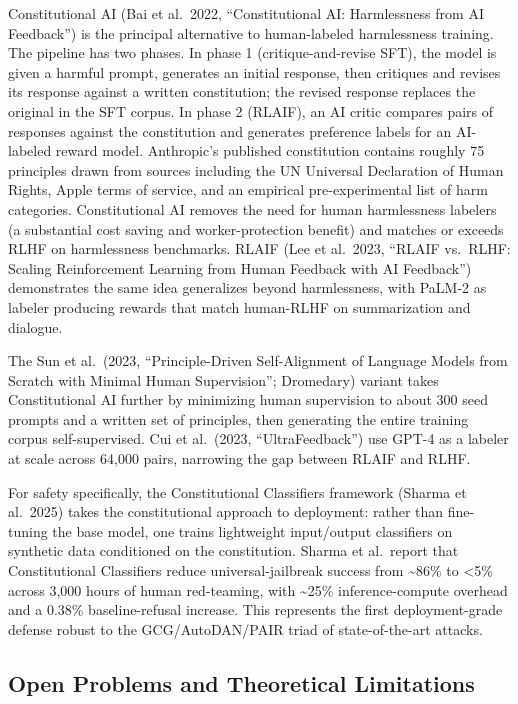 \documentclass{article}
\begin{document}
Constitutional AI (Bai et al.~2022, ``Constitutional AI: Harmlessness from AI Feedback'') is the principal alternative to human-labeled harmlessness training. The pipeline has two phases. In phase 1 (critique-and-revise SFT), the model is given a harmful prompt, generates an initial response, then critiques and revises its response against a written constitution; the revised response replaces the original in the SFT corpus. In phase 2 (RLAIF), an AI critic compares pairs of responses against the constitution and generates preference labels for an AI-labeled reward model. Anthropic's published constitution contains roughly 75 principles drawn from sources including the UN Universal Declaration of Human Rights, Apple terms of service, and an empirical pre-experimental list of harm categories. Constitutional AI removes the need for human harmlessness labelers (a substantial cost saving and worker-protection benefit) and matches or exceeds RLHF on harmlessness benchmarks. RLAIF (Lee et al.~2023, ``RLAIF vs.~RLHF: Scaling Reinforcement Learning from Human Feedback with AI Feedback'') demonstrates the same idea generalizes beyond harmlessness, with PaLM-2 as labeler producing rewards that match human-RLHF on summarization and dialogue.

The Sun et al.~(2023, ``Principle-Driven Self-Alignment of Language Models from Scratch with Minimal Human Supervision''; Dromedary) variant takes Constitutional AI further by minimizing human supervision to about 300 seed prompts and a written set of principles, then generating the entire training corpus self-supervised. Cui et al.~(2023, ``UltraFeedback'') use GPT-4 as a labeler at scale across 64,000 pairs, narrowing the gap between RLAIF and RLHF.

For safety specifically, the Constitutional Classifiers framework (Sharma et al.~2025) takes the constitutional approach to deployment: rather than fine-tuning the base model, one trains lightweight input/output classifiers on synthetic data conditioned on the constitution. Sharma et al.~report that Constitutional Classifiers reduce universal-jailbreak success from \textasciitilde86\% to \textless5\% across 3,000 hours of human red-teaming, with \textasciitilde25\% inference-compute overhead and a 0.38\% baseline-refusal increase. This represents the first deployment-grade defense robust to the GCG/AutoDAN/PAIR triad of state-of-the-art attacks.

\subsection{Open Problems and Theoretical Limitations}\label{open-problems-and-theoretical-limitations}
\end{document}
